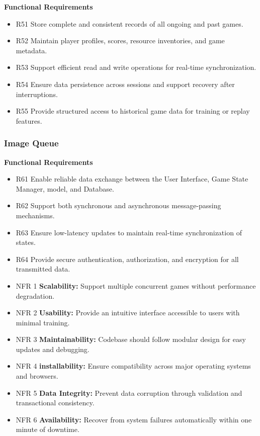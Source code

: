 \documentclass{article}
\begin{document}
\textbf{Functional Requirements}

\begin{itemize}
  \item R51 Store complete and consistent records of all ongoing and past \emph{\Catan{}} games.
  \item R52 Maintain player profiles, scores, resource inventories, and game metadata.
  \item R53 Support efficient read and write operations for real-time synchronization.
  \item R54 Ensure data persistence across sessions and support recovery after interruptions.
  \item R55 Provide structured access to historical game data for training or replay features.
\end{itemize}


\subsubsection{Image Queue}

\textbf{Functional Requirements}

\begin{itemize}
  \item R61 Enable reliable data exchange between the User Interface, Game State Manager, \AI{} model, and Database.
  \item R62 Support both synchronous and asynchronous message-passing mechanisms.
  \item R63 Ensure low-latency updates to maintain real-time synchronization of states.
  \item R64 Provide secure authentication, authorization, and encryption for all transmitted data.
\end{itemize}


\begin{itemize}
  \item NFR 1 \textbf{Scalability:} Support multiple concurrent games without
        performance degradation.
  \item NFR 2 \textbf{Usability:} Provide an intuitive interface accessible to users
        with minimal training.
  \item NFR 3 \textbf{Maintainability:} Codebase should follow modular design for easy
        updates and debugging.
  \item NFR 4 \textbf{installability:} Ensure compatibility across major operating systems
        and browsers.
  \item NFR 5 \textbf{Data Integrity:} Prevent data corruption through validation and
        transactional consistency.
  \item NFR 6 \textbf{Availability:} Recover from system failures automatically within
        one minute of downtime.
\end{itemize}
\end{document}
